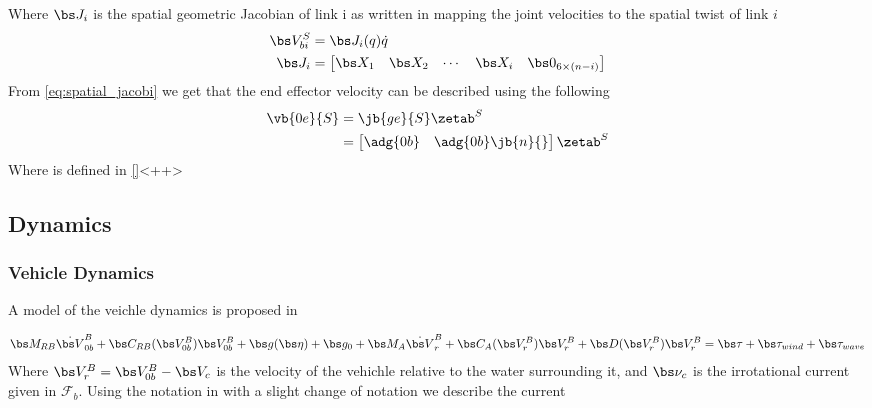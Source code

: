 Where $\bs J_i$ is the spatial geometric Jacobian of link i as written in \cite{kristin_jant} mapping the joint velocities to the spatial twist of link $i$
\begin{align}
  \bs V_{bi}^S &=\bs J_i(q)\dot q
  \label{eq:mappint1}
	\\
	\bs J_i&=\begin{bmatrix}  \bs X_1 & \bs X_2 & \cdots & \bs X_i & \bs 0_{6 \times (n-i)}    \end{bmatrix}
	\label{eq:Ji}
\end{align}
From \eqref{eq:spatial_jacobi} we get that the end effector velocity can be described using the following
\begin{align}
	\vb{0e}{S} &= \jb{ge}{S}\zetab^S
	\label{eq:ee_velo}
	\\
	&=\begin{bmatrix} \adg{0b} & \adg{0b}\jb{n}{}\end{bmatrix}\zetab^S
\end{align}
Where  is defined in \eqref{}<++>









\subsection{Dynamics}

\subsubsection{Vehicle Dynamics}

A model of the veichle dynamics is proposed in \cite{fs} 

\begin{align}
\bs M_{RB}\dot{\bs V}_{0b}^B + \bs C_{RB}(\bs V_{0b}^B)\bs V_{0b}^B + \bs g(\bs \eta) + \bs g_0 + \bs M_A \dot{\bs V}_{r}^B  + \bs C_A(\bs V_{r}^B) \bs V_{r}^B + \bs D(\bs V_{r}^B)\bs V_{r}^B = \bs \tau + \bs \tau_{wind} + \bs \tau_{wave} 
\label{eq:fossen1}
\end{align}
Where $ \bs V_{r}^B = \bs V_{0b}^B - \bs V_c$ is the velocity of the vehichle relative to the water surrounding it, and $ \bs \nu_c$ is the irrotational current given in $\mathcal F_b$. Using the notation in \cite{fs} with a slight change of notation we describe the current

